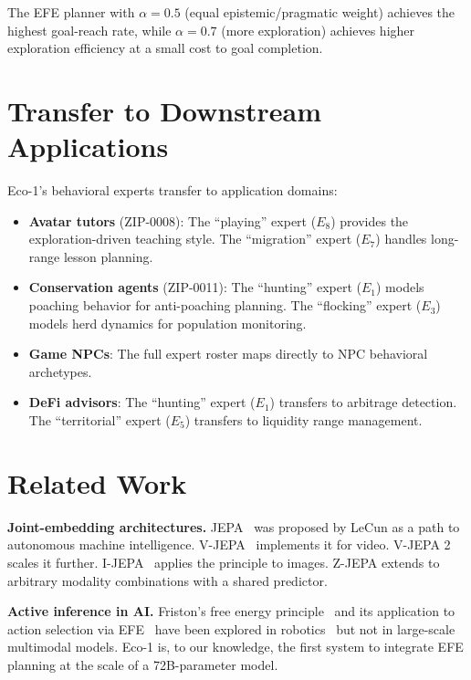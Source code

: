 \documentclass[11pt,letterpaper]{article}
\begin{document}
The EFE planner with $\alpha = 0.5$ (equal epistemic/pragmatic weight) achieves the highest goal-reach rate, while $\alpha = 0.7$ (more exploration) achieves higher exploration efficiency at a small cost to goal completion.

\section{Transfer to Downstream Applications}

Eco-1's behavioral experts transfer to application domains:

\begin{itemize}
    \item \textbf{Avatar tutors} (ZIP-0008): The ``playing'' expert ($E_8$) provides the exploration-driven teaching style. The ``migration'' expert ($E_7$) handles long-range lesson planning.
    \item \textbf{Conservation agents} (ZIP-0011): The ``hunting'' expert ($E_1$) models poaching behavior for anti-poaching planning. The ``flocking'' expert ($E_3$) models herd dynamics for population monitoring.
    \item \textbf{Game NPCs}: The full expert roster maps directly to NPC behavioral archetypes.
    \item \textbf{DeFi advisors}: The ``hunting'' expert ($E_1$) transfers to arbitrage detection. The ``territorial'' expert ($E_5$) transfers to liquidity range management.
\end{itemize}

\section{Related Work}

\textbf{Joint-embedding architectures.} JEPA~\cite{lecun2022path} was proposed by LeCun as a path to autonomous machine intelligence. V-JEPA~\cite{bardes2024vjepa} implements it for video. V-JEPA 2~\cite{bardes2025vjepa2} scales it further. I-JEPA~\cite{assran2023self} applies the principle to images. Z-JEPA extends to arbitrary modality combinations with a shared predictor.

\textbf{Active inference in AI.} Friston's free energy principle~\cite{friston2010free} and its application to action selection via EFE~\cite{champion2024expected} have been explored in robotics~\cite{pio2016active} but not in large-scale multimodal models. Eco-1 is, to our knowledge, the first system to integrate EFE planning at the scale of a 72B-parameter model.
\end{document}
